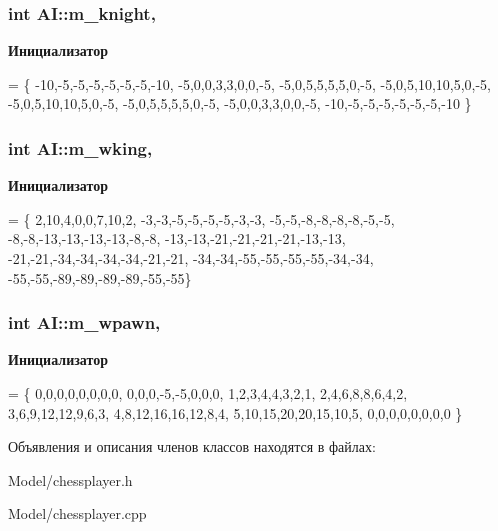 \subsubsection[{m\+\_\+knight}]{\setlength{\rightskip}{0pt plus 5cm}int A\+I\+::m\+\_\+knight\hspace{0.3cm}{\ttfamily [static]}, {\ttfamily [protected]}}\label{class_a_i_adbe96956dc1a50f47c828c04072cecfe}
{\bfseries Инициализатор}
\begin{DoxyCode}
= \{
    -10,-5,-5,-5,-5,-5,-5,-10,
    -5,0,0,3,3,0,0,-5,
    -5,0,5,5,5,5,0,-5,
    -5,0,5,10,10,5,0,-5,
    -5,0,5,10,10,5,0,-5,
    -5,0,5,5,5,5,0,-5,
    -5,0,0,3,3,0,0,-5,
    -10,-5,-5,-5,-5,-5,-5,-10 \}
\end{DoxyCode}
\hypertarget{class_a_i_ac30650d294d82469e1c869e76ee7986f}{}
\subsubsection[{m\+\_\+wking}]{\setlength{\rightskip}{0pt plus 5cm}int A\+I\+::m\+\_\+wking\hspace{0.3cm}{\ttfamily [static]}, {\ttfamily [protected]}}\label{class_a_i_ac30650d294d82469e1c869e76ee7986f}
{\bfseries Инициализатор}
\begin{DoxyCode}
= \{
    2,10,4,0,0,7,10,2,
    -3,-3,-5,-5,-5,-5,-3,-3,
    -5,-5,-8,-8,-8,-8,-5,-5,
    -8,-8,-13,-13,-13,-13,-8,-8,
    -13,-13,-21,-21,-21,-21,-13,-13,
    -21,-21,-34,-34,-34,-34,-21,-21,
    -34,-34,-55,-55,-55,-55,-34,-34,
    -55,-55,-89,-89,-89,-89,-55,-55\}
\end{DoxyCode}
\hypertarget{class_a_i_afc5127e7859211a872a6df3fdbe971d0}{}
\subsubsection[{m\+\_\+wpawn}]{\setlength{\rightskip}{0pt plus 5cm}int A\+I\+::m\+\_\+wpawn\hspace{0.3cm}{\ttfamily [static]}, {\ttfamily [protected]}}\label{class_a_i_afc5127e7859211a872a6df3fdbe971d0}
{\bfseries Инициализатор}
\begin{DoxyCode}
= \{
    0,0,0,0,0,0,0,0,
    0,0,0,-5,-5,0,0,0,
    1,2,3,4,4,3,2,1,
    2,4,6,8,8,6,4,2,
    3,6,9,12,12,9,6,3,
    4,8,12,16,16,12,8,4,
    5,10,15,20,20,15,10,5,
    0,0,0,0,0,0,0,0 \}
\end{DoxyCode}


Объявления и описания членов классов находятся в файлах\+:\begin{DoxyCompactItemize}
\item 
Model/chessplayer.\+h\item 
Model/chessplayer.\+cpp\end{DoxyCompactItemize}
